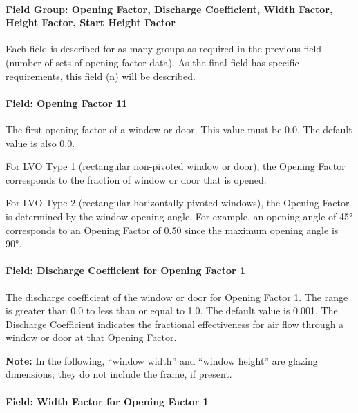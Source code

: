 \paragraph{Field Group: Opening Factor, Discharge Coefficient, Width Factor, Height Factor, Start Height Factor}\label{field-group-opening-factor-discharge-coefficient-width-factor-height-factor-start-height-factor}

Each field is described for as many groups as required in the previous field (number of sets of opening factor data). As the final field has specific requirements, this field (n) will be described.

\paragraph{Field: Opening Factor 11}\label{field-opening-factor-11}

The first opening factor of a window or door. This value must be 0.0. The default value is also 0.0.

For LVO Type 1 (rectangular non-pivoted window or door), the Opening Factor corresponds to the fraction of window or door that is opened.

For LVO Type 2 (rectangular horizontally-pivoted windows), the Opening Factor is determined by the window opening angle. For example, an opening angle of 45° corresponds to an Opening Factor of 0.50 since the maximum opening angle is 90°.

\paragraph{Field: Discharge Coefficient for Opening Factor 1}\label{field-discharge-coefficient-for-opening-factor-1}

The discharge coefficient of the window or door for Opening Factor 1. The range is greater than 0.0 to less than or equal to 1.0. The default value is 0.001. The Discharge Coefficient indicates the fractional effectiveness for air flow through a window or door at that Opening Factor.

\textbf{Note:} In the following, ``window width'' and ``window height'' are glazing dimensions; they do not include the frame, if present.

\paragraph{Field: Width Factor for Opening Factor 1}\label{field-width-factor-for-opening-factor-1}

